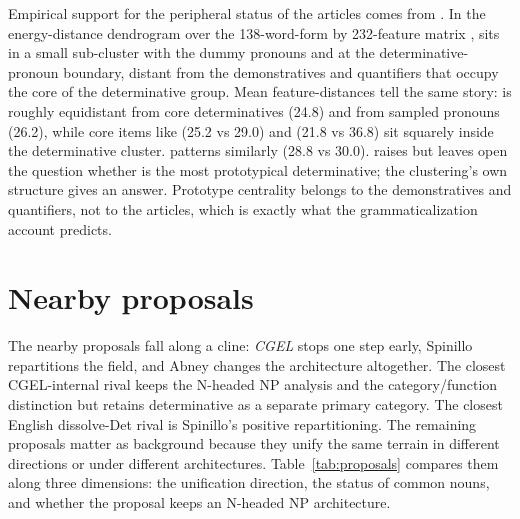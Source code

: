 \documentclass[12pt]{article}
\begin{document}
Empirical support for the peripheral status of the articles comes from \textcite{reynolds2021}. In the energy-distance dendrogram over the 138-word-form by 232-feature matrix \citep{reynolds2021matrix},  sits in a small sub-cluster with the dummy pronouns  and  at the determinative-pronoun boundary, distant from the demonstratives and quantifiers that occupy the core of the determinative group. Mean feature-distances tell the same story:  is roughly equidistant from core determinatives (24.8) and from sampled pronouns (26.2), while core items like  (25.2 vs 29.0) and  (21.8 vs 36.8) sit squarely inside the determinative cluster.  patterns similarly (28.8 vs 30.0). \textcite{reynolds2021} raises but leaves open the question whether  is the most prototypical determinative; the clustering's own structure gives an answer. Prototype centrality belongs to the demonstratives and quantifiers, not to the articles, which is exactly what the grammaticalization account predicts.

\section{Nearby proposals}\label{sec:nearby}

The nearby proposals fall along a cline: \textit{CGEL} stops one step early, Spinillo repartitions the field, and Abney changes the architecture altogether. The closest CGEL-internal rival keeps the N-headed NP analysis and the category/function distinction but retains determinative as a separate primary category. The closest English dissolve-Det rival is Spinillo's positive repartitioning. The remaining proposals matter as background because they unify the same terrain in different directions or under different architectures. Table~\ref{tab:proposals} compares them along three dimensions: the unification direction, the status of common nouns, and whether the proposal keeps an N-headed NP architecture.
\end{document}
